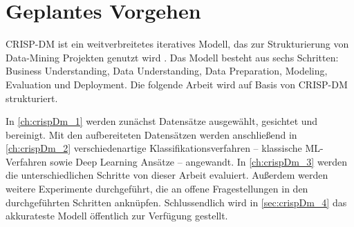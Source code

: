 \section{Geplantes Vorgehen}

\ac{CRISP-DM} ist ein weitverbreitetes iteratives Modell, das zur Strukturierung von Data-Mining Projekten genutzt wird \autocite{martinez-plumed_casp-dm_2017, chapman_crisp-dm_2000}. Das Modell besteht aus sechs Schritten: Business Understanding, Data Understanding, Data Preparation, Modeling, Evaluation und Deployment. Die folgende Arbeit wird auf Basis von \ac{CRISP-DM} strukturiert.

In \autoref{ch:crispDm_1} werden zunächst Datensätze ausgewählt, gesichtet und bereinigt. Mit den aufbereiteten Datensätzen werden anschließend in \autoref{ch:crispDm_2} verschiedenartige Klassifikationsverfahren -- klassische \ac{ML}-Verfahren sowie Deep Learning Ansätze -- angewandt. In \autoref{ch:crispDm_3} werden die unterschiedlichen Schritte von dieser Arbeit evaluiert. Außerdem werden weitere Experimente durchgeführt, die an offene Fragestellungen in den durchgeführten Schritten anknüpfen. Schlussendlich wird in \autoref{sec:crispDm_4} das akkurateste Modell öffentlich zur Verfügung gestellt.
